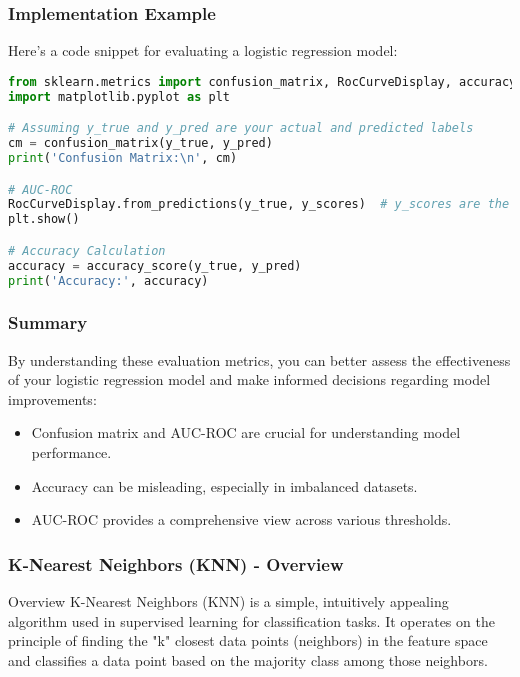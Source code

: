 \documentclass[aspectratio=169]{beamer}
\begin{document}
\begin{frame}[fragile]
    \frametitle{Implementation Example}
    Here's a code snippet for evaluating a logistic regression model:
    
    \begin{lstlisting}[language=Python]
from sklearn.metrics import confusion_matrix, RocCurveDisplay, accuracy_score
import matplotlib.pyplot as plt

# Assuming y_true and y_pred are your actual and predicted labels
cm = confusion_matrix(y_true, y_pred)
print('Confusion Matrix:\n', cm)

# AUC-ROC
RocCurveDisplay.from_predictions(y_true, y_scores)  # y_scores are the probabilities from the model
plt.show()

# Accuracy Calculation
accuracy = accuracy_score(y_true, y_pred)
print('Accuracy:', accuracy)
    \end{lstlisting}
\end{frame}

\begin{frame}
    \frametitle{Summary}
    By understanding these evaluation metrics, you can better assess the effectiveness of your logistic regression model and make informed decisions regarding model improvements:
    \begin{itemize}
        \item Confusion matrix and AUC-ROC are crucial for understanding model performance.
        \item Accuracy can be misleading, especially in imbalanced datasets.
        \item AUC-ROC provides a comprehensive view across various thresholds.
    \end{itemize}
\end{frame}

\begin{frame}[fragile]
    \frametitle{K-Nearest Neighbors (KNN) - Overview}
    \begin{block}{Overview}
        K-Nearest Neighbors (KNN) is a simple, intuitively appealing algorithm used in supervised learning for classification tasks.
        It operates on the principle of finding the "k" closest data points (neighbors) in the feature space and classifies a data point based on the majority class among those neighbors.
    \end{block}
\end{frame}
\end{document}
